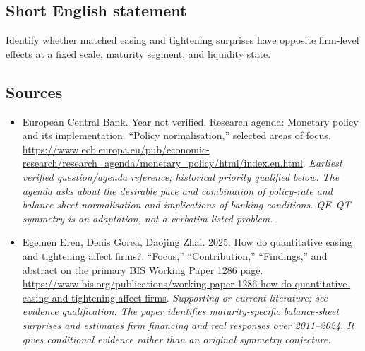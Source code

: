 \documentclass[11pt]{article}
\begin{document}
\subsection{Short English statement}
Identify whether matched easing and tightening surprises have opposite firm-level effects at a fixed scale, maturity segment, and liquidity state.

\subsection{Sources}
\begin{itemize}\raggedright
\item[\textnormal{[S1]}]\hypertarget{source:30007527:1}{} European Central Bank. Year not verified. Research agenda: Monetary policy and its implementation. “Policy normalisation,” selected areas of focus.
\url{https://www.ecb.europa.eu/pub/economic-research/research_agenda/monetary_policy/html/index.en.html}.
{\small\textit{Earliest verified question/agenda reference; historical priority qualified below. The agenda asks about the desirable pace and combination of policy-rate and balance-sheet normalisation and implications of banking conditions. QE–QT symmetry is an adaptation, not a verbatim listed problem.}}

\item[\textnormal{[S2]}]\hypertarget{source:30007527:2}{} Egemen Eren, Denis Gorea, Daojing Zhai. 2025. How do quantitative easing and tightening affect firms?. “Focus,” “Contribution,” “Findings,” and abstract on the primary BIS Working Paper 1286 page.
\url{https://www.bis.org/publications/working-paper-1286-how-do-quantitative-easing-and-tightening-affect-firms}.
{\small\textit{Supporting or current literature; see evidence qualification. The paper identifies maturity-specific balance-sheet surprises and estimates firm financing and real responses over 2011–2024. It gives conditional evidence rather than an original symmetry conjecture.}}
\end{itemize}
\end{document}
